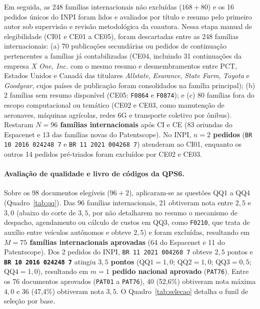 \documentclass[12pt,a4paper]{article}
\begin{document}
Em seguida, as 248 famílias internacionais não excluídas ($168 + 80$) e os 16 pedidos únicos do INPI foram lidos e avaliados por título e resumo pelo primeiro autor sob supervisão e revisão metodológica da coautora. Nessa etapa manual de elegibilidade (CI01 e CE01 a CE05), foram descartadas entre as 248 famílias internacionais: (a) 70 publicações secundárias ou pedidos de continuação pertencentes a famílias já contabilizadas (CE04, incluindo 31 continuações da empresa \textit{X One, Inc.} com o mesmo resumo e desmembramentos entre PCT, Estados Unidos e Canadá das titulares \textit{Allstate}, \textit{Esurance}, \textit{State Farm}, \textit{Toyota} e \textit{Goodyear}, cujos países de publicação foram consolidados na família principal); (b) 2 famílias sem resumo disponível (CE05: \texttt{F0864} e \texttt{F0874}); e (c) 80 famílias fora do escopo computacional ou temático (CE02 e CE03, como manutenção de aeronaves, máquinas agrícolas, redes 6G e transporte coletivo por ônibus). Restaram \textbf{$N = 96$ famílias internacionais} após CI e CE (83 oriundas do Espacenet e 13 das famílias novas do Patentscope). No INPI, \textbf{$n = 2$ pedidos} (\texttt{BR 10 2016 024248 7} e \texttt{BR 11 2021 004268 7}) atenderam ao CI01, enquanto os outros 14 pedidos pré-triados foram excluídos por CE02 e CE03.

\paragraph{Avaliação de qualidade e livro de códigos da QPS6.} Sobre os 98 documentos elegíveis ($96 + 2$), aplicaram-se as questões QQ1 a QQ4 (Quadro~\ref{tab:qq}). Das 96 famílias internacionais, 21 obtiveram nota entre $2{,}5$ e $3{,}0$ (abaixo do corte de $3{,}5$, por não detalharem no resumo o mecanismo de despacho, agendamento ou cálculo de custos em QQ3, como \texttt{F0210}, que trata de auxílio entre veículos autônomos e obteve $2{,}5$) e foram excluídas, resultando em \textbf{$M = 75$ famílias internacionais aprovadas} (64 do Espacenet e 11 do Patentscope). Dos 2 pedidos do INPI, \texttt{BR 11 2021 004268 7} obteve $2{,}5$ pontos e \textbf{\texttt{BR 10 2016 024248 7}} atingiu \textbf{$3{,}5$ pontos} ($\text{QQ1}=1{,}0$; $\text{QQ2}=1{,}0$; $\text{QQ3}=0{,}5$; $\text{QQ4}=1{,}0$), resultando em \textbf{$m = 1$ pedido nacional aprovado} (\texttt{PAT76}). Entre os 76 documentos aprovados (\texttt{PAT01} a \texttt{PAT76}), 40 (52,6\%) obtiveram nota máxima $4{,}0$ e 36 (47,4\%) obtiveram nota $3{,}5$. O Quadro~\ref{tab:selecao} detalha o funil de seleção por base.
\end{document}
